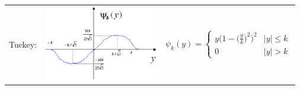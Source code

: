 \documentclass[letterpaper,12pt]{article}
\begin{document}
\pagestyle{empty}
\thispagestyle{empty}

\noindent

\begin{tabular}{lcl}
Tuckey: 
&
 \begin{minipage}{5cm}
  \includegraphics[clip,width=5cm]{tuckey.eps}
 \end{minipage}
&
 \begin{minipage}{6.3cm}
  \begin{equation}
   \psi_k(y) =
   \begin{cases}
    y \Big(1- \big(\frac{y}{k}\big)^2 \Big)^2 & \text{$|y| \le k$} \\
    0 & \text{$|y| > k$}
   \end{cases}
  \end{equation}
 \end{minipage}
\end{tabular}
\end{document}
